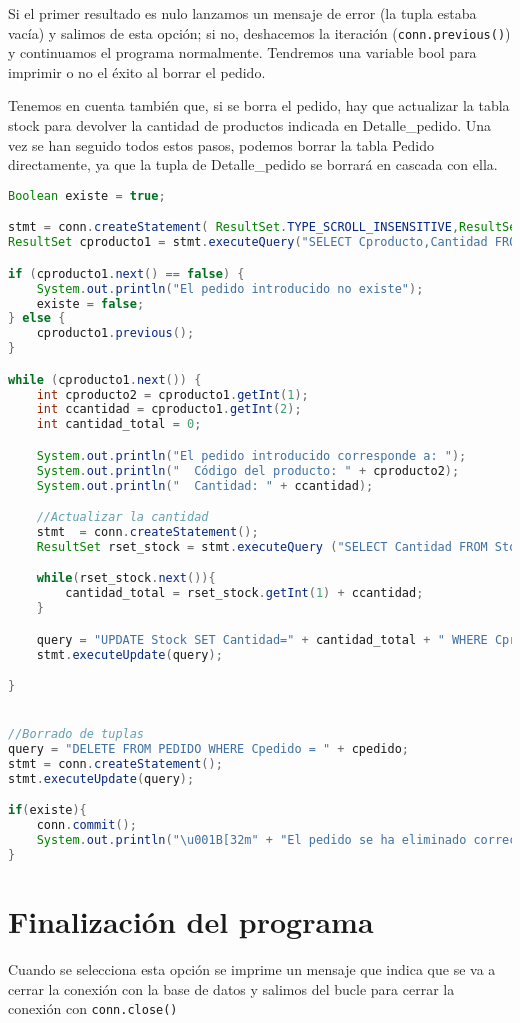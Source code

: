 Si el primer resultado es nulo lanzamos un mensaje de error (la tupla estaba vacía) y salimos de esta opción; si no, deshacemos la iteración (\texttt{conn.previous()}) y continuamos el programa normalmente. Tendremos una variable bool para imprimir o no el éxito al borrar el pedido.

Tenemos en cuenta también que, si se borra el pedido, hay que actualizar la tabla stock para devolver la cantidad de productos indicada en Detalle\_pedido. Una vez se han seguido todos estos pasos, podemos borrar la tabla Pedido directamente, ya que la tupla de Detalle_pedido se borrará en cascada con ella.

\begin{lstlisting}[language=Java]
Boolean existe = true;

stmt = conn.createStatement( ResultSet.TYPE_SCROLL_INSENSITIVE,ResultSet.CONCUR_READ_ONLY);
ResultSet cproducto1 = stmt.executeQuery("SELECT Cproducto,Cantidad FROM Detalle_pedido WHERE Cpedido='"+ cpedido + "'");

if (cproducto1.next() == false) {
	System.out.println("El pedido introducido no existe");
	existe = false;
} else {
	cproducto1.previous();
}

while (cproducto1.next()) {
	int cproducto2 = cproducto1.getInt(1);
	int ccantidad = cproducto1.getInt(2);
	int cantidad_total = 0;

	System.out.println("El pedido introducido corresponde a: ");
	System.out.println("  Código del producto: " + cproducto2);
	System.out.println("  Cantidad: " + ccantidad);

	//Actualizar la cantidad
	stmt  = conn.createStatement();
	ResultSet rset_stock = stmt.executeQuery ("SELECT Cantidad FROM Stock WHERE Cproducto='" + cproducto2 + "'");

	while(rset_stock.next()){
		cantidad_total = rset_stock.getInt(1) + ccantidad;
	}

	query = "UPDATE Stock SET Cantidad=" + cantidad_total + " WHERE Cproducto='" + cproducto2+ "'";
	stmt.executeUpdate(query);

}


//Borrado de tuplas
query = "DELETE FROM PEDIDO WHERE Cpedido = " + cpedido;
stmt = conn.createStatement();
stmt.executeUpdate(query);

if(existe){
	conn.commit();
	System.out.println("\u001B[32m" + "El pedido se ha eliminado correctamente" + "\u001B[0m");
}
\end{lstlisting}


\section{Finalización del programa}

Cuando se selecciona esta opción se imprime un mensaje que indica que se va a cerrar la conexión con la base de datos y salimos del bucle para cerrar la conexión con \texttt{conn.close()}
